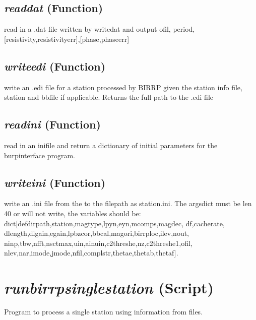 \subsection{\textit{readdat} (Function)}
\label{ssec:processing.birrptools.readdat}

read in a .dat file written by writedat and output 
    ofil, period,[resistivity,resistivityerr],[phase,phaseerr]

\subsection{\textit{writeedi} (Function)}
\label{ssec:processing.birrptools.writeedi}

write an .edi file for a station 
    processed by BIRRP given the station info file, station and bbfile if
    applicable. Returns the full path to the .edi file

\subsection{\textit{readini} (Function)}
\label{ssec:processing.birrptools.readini}

read in an inifile and return a dictionary of 
    initial parameters for the burpinterface program.

\subsection{\textit{writeini} (Function)}
\label{ssec:processing.birrptools.writeini}

write an .ini file from the to
    the filepath as station.ini.  The argsdict must be len 40 or will not write,
    the variables should be: dict[defdirpath,station,magtype,lpyn,eyn,mcomps,magdec,
    df,cacherate, dlength,dlgain,egain,lpbzcor,bbcal,magori,birrploc,ilev,nout,
    ninp,tbw,nfft,nsctmax,uin,ainuin,c2threshe,nz,c2threshe1,ofil,
    nlev,nar,imode,jmode,nfil,complstr,thetae,thetab,thetaf].




\section{\textit{runbirrpsinglestation} (Script) }
\label{sec:processing.runbirrpsinglestation}

Program to process a single station using information from files. 

